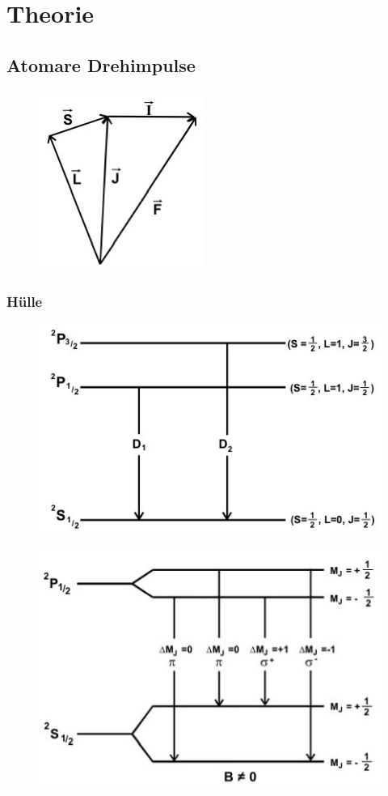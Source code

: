 \section[Theorie]{Theorie \textnormal{\cite{pumpen}}}
\label{sec:theorie}

\subsection{Atomare Drehimpulse}

\begin{figure}[H]
	\centering
	\includegraphics[width=0.25\linewidth]{content/grafik/drehimpulse.jpg}
	\caption{\cite{pumpen}}
	\label{fig:drehimpulse}
\end{figure}

\subsubsection{Hülle}

\begin{figure}[H]
	\centering
	\includegraphics[width=0.5\linewidth]{content/grafik/duplett.jpg}
	\caption{\cite{pumpen}}
	\label{fig:duplett}
\end{figure}

\begin{figure}[H]
	\centering
	\includegraphics[width=0.55\linewidth]{content/grafik/zeeman.jpg}
	\caption{\cite{pumpen}}
	\label{fig:zeeman}
\end{figure}

